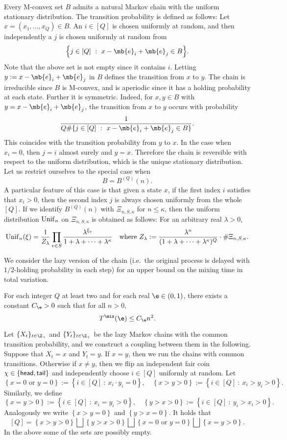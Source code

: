 \documentclass[12pt, reqno]{amsart}
\begin{document}
Every M-convex set $B$
admits a natural Markov chain with the uniform stationary distribution.
The transition probability is defined as follows:
Let $x=(x_1, \dots, x_Q) \in B$.
An $i\in [Q]$ is chosen uniformly at random,
and then independently a $j$ is chosen uniformly at random from
\[
\Big\{j\in [Q] \ : \ x-\mb{e}_i+\mb{e}_j \in B\Big\}.
\]
Note that the above set is not empty since it contains $i$.
Letting $y:=x-\mb{e}_i+\mb{e}_j$ in $B$
defines the transition from $x$ to $y$.
The chain is irreducible since $B$ is M-convex,
and is aperiodic since it has a holding probability at each state.
Further it is symmetric.
Indeed,
for $x, y \in B$ with $y=x-\mb{e}_i+\mb{e}_j$,
the transition from $x$ to $y$ occurs with probability
\[
\frac{1}{Q\#\{j \in [Q] \ : \ x-\mb{e}_i+\mb{e}_j \in B\}}.
\]
This coincides with the transition probability from $y$ to $x$.
In the case when $x_i=0$,
then $j=i$ almost surely and $y=x$.
Therefore the chain is reversible with respect to the uniform distribution,
which is the unique stationary distribution.
Let us restrict ourselves to the special case when
\[
B=B^{(Q)}(n).
\]
A particular feature of this case is that given a state $x$,
if the first index $i$ satisfies that $x_i>0$,
then the second index $j$ is always chosen uniformly from the whole $[Q]$.
If we identify $B^{(Q)}(n)$ with $\Xi_{n, S, \kappa}$ for $n \le \kappa$,
then
the uniform distribution ${\rm Unif}_n$ on $\Xi_{n, S, \kappa}$ is obtained as follows:
For an arbitrary real $\lambda>0$,
\[
{\rm Unif}_n(\xi)=\frac{1}{Z_\lambda}\prod_{v \in S}\frac{\lambda^{\xi_v}}{1+\lambda+\cdots+\lambda^\kappa} \quad \text{where $Z_\lambda:= \frac{\lambda^n}{(1+\lambda+\cdots+\lambda^\kappa)^Q}$}\cdot\# \Xi_{n, S, \kappa}.
\]

We consider the lazy version of the chain (i.e.\ the original process is delayed with $1/2$-holding probability in each step) for an upper bound on the mixing time in total variation.

\begin{proposition}\label{Prop:uniform}
For each integer $Q$ at least two and for each real $\e\in (0, 1)$,
there exists a constant $C_\e>0$ such that for all $n>0$,
\[
T^\mix(\e)\le C_\e n^2.
\]
\end{proposition}

\proof
Let $\{X_t\}_{t \in \Z_+}$ and $\{Y_t\}_{t\in \Z_+}$ be the lazy Markov chains with the common transition probability,
and we construct a coupling between them in the following.
Suppose that $X_t=x$ and $Y_t=y$.
If $x=y$,
then we run the chains with common transitions.
Otherwise if $x\neq y$,
then we flip an independent fair coin $\chi \in \{{\sf head}, {\sf tail}\}$ and independently choose $i \in [Q]$ uniformly at random.
Let 
\[
\left\{{\text{$x=0$ or $y=0$}}\right\}:=\left\{i \in [Q] \ : \ x_i\cdot y_i=0\right\},
\quad
\left\{x>y>0\right\}:=\left\{i \in [Q] \ : \ x_i>y_i>0\right\}.
\]
Similarly, we define
\[
\left\{x=y>0\right\}:=\left\{i \in [Q] \ : \ x_i=y_i>0\right\},
\quad
\left\{y>x>0\right\}:=\left\{i \in [Q] \ : \ y_i>x_i>0\right\}.
\]
Analogously we write $\left\{x>y=0\right\}$ and $\left\{y>x=0\right\}$.
It holds that
\[
[Q]=\left\{x>y>0\right\}\bigsqcup\left\{y>x>0\right\}\bigsqcup\left\{\text{$x=0$ or $y=0$}\right\}\bigsqcup\left\{x=y>0\right\}.
\]
In the above some of the sets are possibly empty.
\end{document}
